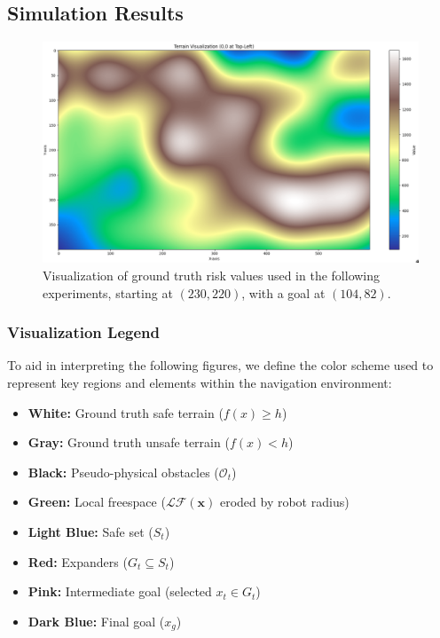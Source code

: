 \subsection{Simulation Results}

\begin{figure}[h]
    \centering
    \includegraphics[width=0.7\linewidth]{figures/terrain.png}
    \caption{Visualization of ground truth risk values used in the following experiments, starting at \((230, 220)\), with a goal at \((104,82)\).}
    \label{fig:terrain}
\end{figure}

\subsubsection{Visualization Legend}

To aid in interpreting the following figures, we define the color scheme used to represent key regions and elements within the navigation environment:

\begin{itemize}
    \item \textbf{White:} Ground truth safe terrain (\( f(x) \geq h \))
    \item \textbf{Gray:} Ground truth unsafe terrain (\( f(x) < h \))
    \item \textbf{Black:} Pseudo-physical obstacles (\( \mathcal{O}_t \))
    \item \textbf{Green:} Local freespace (\( \mathcal{LF}(\mathbf{x}) \) eroded by robot radius)
    \item \textbf{Light Blue:} Safe set (\( S_t \))
    \item \textbf{Red:} Expanders (\( G_t \subseteq S_t \))
    \item \textbf{Pink:} Intermediate goal (selected \( x_t \in G_t \))
    \item \textbf{Dark Blue:} Final goal (\( x_g \))
\end{itemize}


